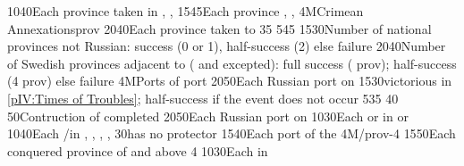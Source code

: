 %
%
{10}{40}{Each province taken in \paysmajeurPologne, \paysmajeurLithuanie,
  \paysukraine}%
%
%
{15}{45}{Each province \provinceNeva, \provinceLivonija, \provinceEstland}%
%
\EUobjective4M{Crimean Annexations}{prov}%
{20}{40}{Each province taken to \payscrimee}%
%
%
{}{35}{}%
%
%
%
{5}{45}{}%
%
%
{15}{30}{Number of national provinces not Russian: success (0 or 1),
  half-success (2) else failure}%
%
%
{20}{40}{Number of Swedish provinces adjacent to \regionBaltique (\regionSuede
  and \regionFinlande excepted): full success ( prov);
  half-success (4 prov) else failure}%
%
%
\EUobjective4M{Ports of }{port}%
{20}{50}{Each Russian port on }%
%
%
{15}{30}{\RUS victorious in \ref{pIV:Times of Troubles}; half-success if the
  event does not occur}%
%
%
%
{5}{35}{}%
%
%
{}{40}{}%
%
%
{}{50}{Contruction of  completed}%
%
%
{20}{50}{Each Russian port on }%
%
%
{10}{30}{Each \COL or \TP in  or }%
%
%
%
{10}{40}{Each \COL/\TP in \granderegionAmour, \granderegionBaikal,
  \granderegionAfghanistan, \granderegionPerse, \continentIndia}%
%
%
{}{30}{\paysPologne has no protector}%
%
%
{15}{40}{Each port of the \regionBaltique}%
%
\EUobjective4M{\payscrimee/\paysmoldavie}{prov-4}%
{15}{50}{Each conquered province of  and  above
  4}%
%
%
%
{10}{30}{Each \COL in \granderegionAlaska}%
%
%
%
